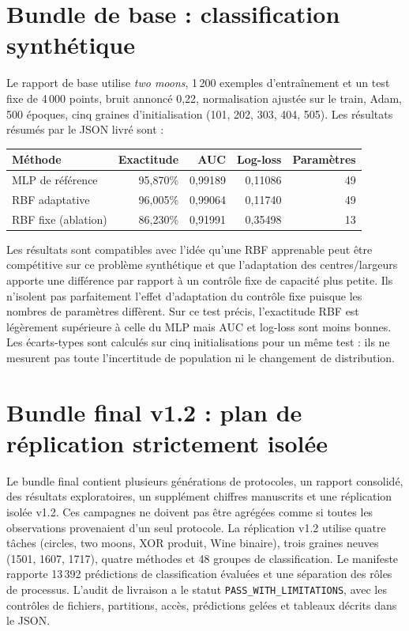 \documentclass[11pt,a4paper,oneside]{report}
\begin{document}
\section{Bundle de base : classification synthétique}
Le rapport de base utilise \emph{two moons}, 1\,200 exemples d'entraînement et un test fixe de 4\,000 points, bruit annoncé 0,22, normalisation ajustée sur le train, Adam, 500 époques, cinq graines d'initialisation (101, 202, 303, 404, 505). Les résultats résumés par le JSON livré sont :
\begin{center}
\begin{tabular}{lrrrr}
\toprule
Méthode & Exactitude & AUC & Log-loss & Paramètres\\
\midrule
MLP de référence & 95,870\% & 0,99189 & 0,11086 & 49\\
RBF adaptative & 96,005\% & 0,99064 & 0,11740 & 49\\
RBF fixe (ablation) & 86,230\% & 0,91991 & 0,35498 & 13\\
\bottomrule
\end{tabular}
\end{center}
Les résultats sont compatibles avec l'idée qu'une RBF apprenable peut être compétitive sur ce problème synthétique et que l'adaptation des centres/largeurs apporte une différence par rapport à un contrôle fixe de capacité plus petite. Ils n'isolent pas parfaitement l'effet d'adaptation du contrôle fixe puisque les nombres de paramètres diffèrent. Sur ce test précis, l'exactitude RBF est légèrement supérieure à celle du MLP mais AUC et log-loss sont moins bonnes. Les écarts-types sont calculés sur cinq initialisations pour un même test : ils ne mesurent pas toute l'incertitude de population ni le changement de distribution.

\section{Bundle final v1.2 : plan de réplication strictement isolée}
Le bundle final contient plusieurs générations de protocoles, un rapport consolidé, des résultats exploratoires, un supplément chiffres manuscrits et une réplication isolée v1.2. Ces campagnes ne doivent pas être agrégées comme si toutes les observations provenaient d'un seul protocole. La réplication v1.2 utilise quatre tâches (circles, two moons, XOR produit, Wine binaire), trois graines neuves (1501, 1607, 1717), quatre méthodes et 48 groupes de classification. Le manifeste rapporte 13\,392 prédictions de classification évaluées et une séparation des rôles de processus. L'audit de livraison a le statut \texttt{PASS\_WITH\_LIMITATIONS}, avec les contrôles de fichiers, partitions, accès, prédictions gelées et tableaux décrits dans le JSON.
\end{document}
